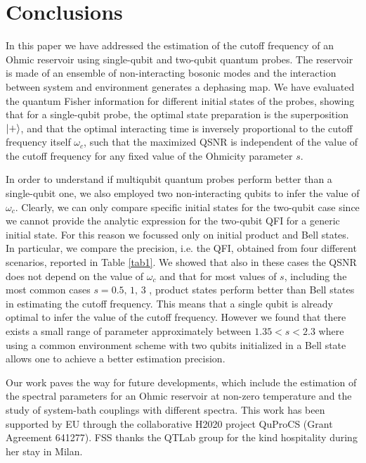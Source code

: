 \documentclass[ pra,a4paper,aps,twocolumn,superscriptaddress]{revtex4-1}
\def\ket#1{\mathinner{|{#1}\rangle}}
\def\tc#1{{\color{black}#1}}
\begin{document}
\section{Conclusions}\label{sec:5}
%
In this paper we have addressed the estimation of the
cutoff frequency of an Ohmic reservoir
using single-qubit and two-qubit quantum probes. The reservoir is made of an ensemble 
of non-interacting bosonic modes and the interaction between system and environment 
generates a dephasing map. We have evaluated the quantum Fisher
information for different initial states of the probes, showing that for a single-qubit probe,  
the optimal  state preparation is  the superposition  $\ket{+}$, and that the optimal 
interacting time is inversely proportional to the cutoff frequency itself $\omega_c$, such
that the maximized QSNR is independent of the value of the cutoff frequency for any 
fixed value of the Ohmicity parameter $s$. 
\par
In order to understand if multiqubit quantum probes perform better than a single-qubit one, 
we also employed two non-interacting qubits  to infer the value of $\omega_c$. 
\tc{Clearly, we can only compare specific initial states for the two-qubit case since we cannot provide the analytic expression for the two-qubit QFI for a generic initial state. For this reason we focussed only on initial product and Bell states.}
In particular, 
we compare the precision, i.e. the QFI, obtained from four different scenarios, reported in Table
\ref{tab1}.
\tc{
We showed that also in these cases the QSNR does not depend on the value of $\omega_c$ and that for most values of $s$, including the most common cases $s=0.5,\,1,\,3$ \cite{paavola}, product states perform better than Bell states in estimating the cutoff frequency. This means that a single qubit is  already optimal to  infer  the value of the cutoff frequency.  However we found that there exists a small range of parameter  approximately between $1.35<s<2.3$ where using a common environment scheme with two qubits initialized in a Bell state allows one to achieve a better estimation precision.
   } 
\par
Our work paves the way for future developments, which include the 
estimation of the spectral parameters for an Ohmic reservoir 
at non-zero temperature and the study of system-bath couplings
with different spectra.
\acknowledgements
This work has been supported by EU through the collaborative H2020 project QuProCS 
(Grant Agreement 641277). FSS thanks the QTLab group
for the kind hospitality during her stay in Milan.
\end{document}
